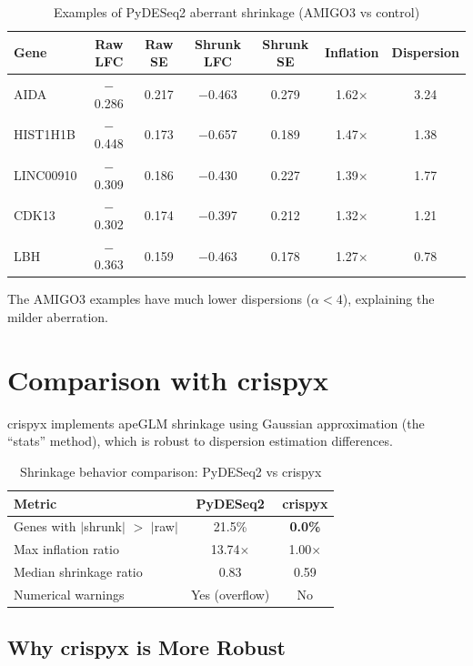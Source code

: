 \documentclass{article}
\begin{document}
\begin{table}[h]
\centering
\caption{Examples of PyDESeq2 aberrant shrinkage (AMIGO3 vs control)}
\label{tab:examples_amigo3}
\begin{tabular}{lcccccc}
\toprule
Gene & Raw LFC & Raw SE & Shrunk LFC & Shrunk SE & Inflation & Dispersion \\
\midrule
AIDA      & $-$0.286 & 0.217 & $-$0.463 & 0.279 & 1.62$\times$ & 3.24 \\
HIST1H1B  & $-$0.448 & 0.173 & $-$0.657 & 0.189 & 1.47$\times$ & 1.38 \\
LINC00910 & $-$0.309 & 0.186 & $-$0.430 & 0.227 & 1.39$\times$ & 1.77 \\
CDK13     & $-$0.302 & 0.174 & $-$0.397 & 0.212 & 1.32$\times$ & 1.21 \\
LBH       & $-$0.363 & 0.159 & $-$0.463 & 0.178 & 1.27$\times$ & 0.78 \\
\bottomrule
\end{tabular}
\end{table}

The AMIGO3 examples have much lower dispersions ($\alpha < 4$), explaining the milder aberration.

\section{Comparison with crispyx}

crispyx implements apeGLM shrinkage using Gaussian approximation (the ``stats'' method), which is robust to dispersion estimation differences.

\begin{table}[h]
\centering
\caption{Shrinkage behavior comparison: PyDESeq2 vs crispyx}
\label{tab:comparison}
\begin{tabular}{lcc}
\toprule
Metric & PyDESeq2 & crispyx \\
\midrule
Genes with $|$shrunk$|$ $>$ $|$raw$|$ & 21.5\% & \textbf{0.0\%} \\
Max inflation ratio & 13.74$\times$ & 1.00$\times$ \\
Median shrinkage ratio & 0.83 & 0.59 \\
Numerical warnings & Yes (overflow) & No \\
\bottomrule
\end{tabular}
\end{table}

\subsection{Why crispyx is More Robust}
\end{document}
